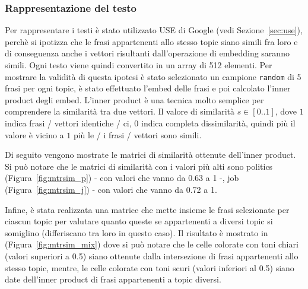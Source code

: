\subsubsection{Rappresentazione del testo}
\label{sssec:rappresentazione}
Per rappresentare i testi è stato utilizzato USE di Google (vedi Sezione~\ref{sec:use}), perchè si ipotizza che le frasi appartenenti allo stesso topic siano simili fra loro e di conseguenza anche i vettori risultanti dall'operazione di embedding saranno simili. Ogni testo viene quindi convertito in un array di 512 elementi. Per mostrare la validità di questa ipotesi è stato selezionato un campione {\tt random} di 5 frasi per ogni topic, è stato effettuato l'embed delle frasi e poi calcolato l'inner product degli embed. L'inner product è una tecnica molto semplice per comprendere la similarità tra due vettori. Il valore di similarità $s \in [0..1]$, dove $1$ indica frasi / vettori identiche / ci, $0$ indica completa dissimilarità, quindi più il valore è vicino a $1$ più le / i frasi / vettori sono simili.

Di seguito vengono mostrate le matrici di similarità ottenute dell'inner product. Si può notare che le matrici di similarità con i valori più alti sono politics (Figura~\ref{fig:mtrsim_p}) - con valori che vanno da 0.63 a 1 -, job (Figura~\ref{fig:mtrsim_j}) - con valori che vanno da 0.72 a 1.

Infine, è stata realizzata una matrice che mette insieme le frasi selezionate per ciascun topic per valutare quanto queste se appartenenti a diversi topic si somiglino (differiscano tra loro in questo caso). Il risultato è mostrato in (Figura~\ref{fig:mtrsim_mix}) dove si può notare che le celle colorate con toni chiari (valori superiori a 0.5) siano ottenute dalla intersezione di frasi appartenenti allo stesso topic, mentre, le celle colorate con toni scuri (valori inferiori al 0.5) siano date dell'inner product di frasi appartenenti a topic diversi.

